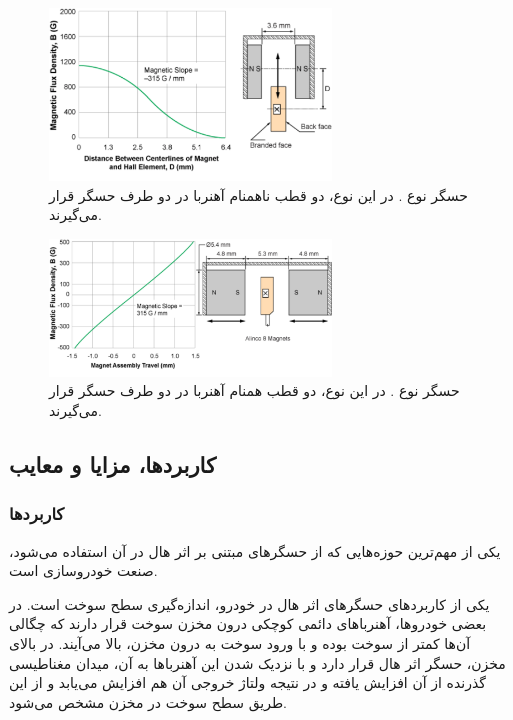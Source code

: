 \documentclass[conference]{IEEEtran-ModifiedForMVIP}
\begin{document}
\begin{figure}[t]
	
	\centering 
	\includegraphics[width=75mm]{Images/7.pdf}
	\caption{حسگر نوع . در این نوع، دو قطب ناهمنام آهنربا در دو طرف حسگر قرار می‌گیرند.
		\cite{alleg}	
	}\label{fig:6}
\end{figure}

\begin{figure}[t]
	
	\centering 
	\includegraphics[width=75mm]{Images/8.pdf}
	\caption{حسگر نوع . در این نوع، دو قطب همنام  آهنربا در دو طرف حسگر قرار می‌گیرند.
		\cite{alleg}	
	}\label{fig:7}
\end{figure}


\subsection{کاربردها، مزایا و معایب}

\subsubsection{کاربردها}
یکی از مهم‌ترین حوزه‌هایی که از حسگر‌های مبتنی بر اثر هال در آن استفاده می‌شود، صنعت خودروسازی است. 

یکی از کاربردهای حسگر‌های اثر هال در خودرو، اندازه‌گیری سطح سوخت است. در بعضی خودروها، آهنرباهای دائمی کوچکی درون مخزن سوخت قرار دارند که چگالی آن‌ها کمتر از سوخت بوده و با ورود سوخت به درون مخزن، بالا می‌آیند. در بالای مخزن، حسگر اثر هال قرار دارد و با نزدیک شدن این آهنرباها به آن، میدان مغناطیسی گذرنده از آن افزایش یافته و در نتیجه ولتاژ خروجی آن‌ هم افزایش می‌یابد و از این طریق سطح سوخت در مخزن مشخص می‌شود. \cite{rs}
\end{document}

